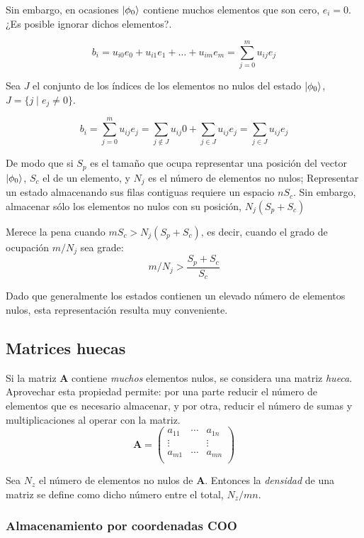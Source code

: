 \documentclass{article}
\newcommand*\mat[1]{ \begin{pmatrix} #1 \end{pmatrix}}
\theoremstyle{definition}
\begin{document}
Sin embargo, en ocasiones $\ket{\phi_0}$ contiene muchos elementos que son cero, 
$e_i = 0$. ¿Es posible ignorar dichos elementos?.

$$ b_i = u_{i0} e_0 + u_{i1} e_1 + \ldots + u_{im} e_m =
	\sum_{j = 0}^{m} u_{ij} e_j
$$

Sea $J$ el conjunto de los índices de los elementos no nulos del estado 
$\ket{\phi_0}$, $ J = \{j \mid e_j \neq 0\} $.

$$ b_i = \sum_{j = 0}^{m} u_{ij} e_j =
	\sum_{j \notin J} u_{ij} 0 + \sum_{j \in J} u_{ij} e_j =
	\sum_{j \in J} u_{ij} e_j
$$

De modo que si $S_p$ es el tamaño que ocupa representar una posición del vector 
$\ket{\phi_0}$, $S_c$ el de un elemento, y $N_j$ es el número de elementos no 
nulos; Representar un estado almacenando sus filas contiguas requiere un espacio 
$nS_c$. Sin embargo, almacenar sólo los elementos no nulos con su posición, 
$N_j(S_p + S_c)$

Merece la pena cuando $mS_c > N_j(S_p + S_c)$, es decir, cuando el grado de 
ocupación $m/N_j$ sea grade:
$$m/N_j > \frac{S_p + S_c}{S_c}$$

Dado que generalmente los estados contienen un elevado número de elementos 
nulos, esta representación resulta muy conveniente.


\subsection{Matrices huecas}

Si la matriz \textbf{A} contiene \textit{muchos} elementos nulos, se considera 
una matriz \textit{hueca}. Aprovechar esta propiedad permite: por una parte 
reducir el número de elementos que es necesario almacenar, y por otra, reducir 
el número de sumas y multiplicaciones al operar con la matriz.
$$ \textbf{A} = \mat{ a_{11} & \cdots & a_{1n} \\
		\vdots &   & \vdots \\
		a_{m1} & \cdots & a_{mn}\\
	}
$$

Sea $N_z$ el número de elementos no nulos de \textbf{A}. Entonces la 
\textit{densidad} de una matriz se define como dicho número entre el total, 
$N_z/mn$.

\subsubsection{Almacenamiento por coordenadas COO}
\end{document}
